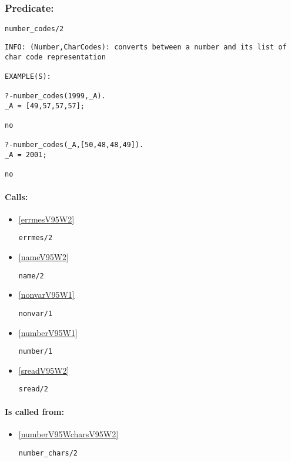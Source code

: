 \subsubsection{Predicate:} \label{numberV95WcodesV95W2}

\begin{verbatim}
number_codes/2
\end{verbatim}

{\small \begin{verbatim}
INFO: (Number,CharCodes): converts between a number and its list of char code representation

EXAMPLE(S):

?-number_codes(1999,_A).
_A = [49,57,57,57];

no

?-number_codes(_A,[50,48,48,49]).
_A = 2001;

no

\end{verbatim}}
\paragraph{Calls:} 
\begin{itemize}
\item \ref{errmesV95W2} 
\begin{verbatim}
errmes/2
\end{verbatim}

\item \ref{nameV95W2} 
\begin{verbatim}
name/2
\end{verbatim}

\item \ref{nonvarV95W1} 
\begin{verbatim}
nonvar/1
\end{verbatim}

\item \ref{numberV95W1} 
\begin{verbatim}
number/1
\end{verbatim}

\item \ref{sreadV95W2} 
\begin{verbatim}
sread/2
\end{verbatim}

\end{itemize}
\paragraph{Is called from:} 
\begin{itemize}
\item \ref{numberV95WcharsV95W2} 
\begin{verbatim}
number_chars/2
\end{verbatim}

\end{itemize}

